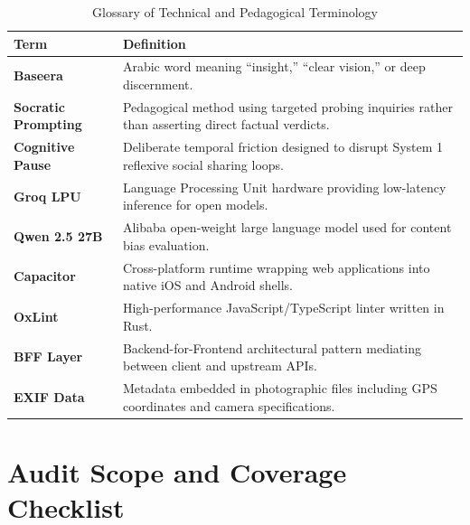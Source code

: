\documentclass[10pt,a4paper]{report}
\begin{document}
\begin{table}[htbp]
\centering
\small
\caption{Glossary of Technical and Pedagogical Terminology}
\begin{tabularx}{\textwidth}{l X}
\toprule
\textbf{Term} & \textbf{Definition} \\
\midrule
\textbf{Baseera} & Arabic word meaning ``insight,'' ``clear vision,'' or deep discernment. \\
\textbf{Socratic Prompting} & Pedagogical method using targeted probing inquiries rather than asserting direct factual verdicts. \\
\textbf{Cognitive Pause} & Deliberate temporal friction designed to disrupt System 1 reflexive social sharing loops. \\
\textbf{Groq LPU} & Language Processing Unit hardware providing low-latency inference for open models. \\
\textbf{Qwen 2.5 27B} & Alibaba open-weight large language model used for content bias evaluation. \\
\textbf{Capacitor} & Cross-platform runtime wrapping web applications into native iOS and Android shells. \\
\textbf{OxLint} & High-performance JavaScript/TypeScript linter written in Rust. \\
\textbf{BFF Layer} & Backend-for-Frontend architectural pattern mediating between client and upstream APIs. \\
\textbf{EXIF Data} & Metadata embedded in photographic files including GPS coordinates and camera specifications. \\
\bottomrule
\end{tabularx}
\end{table}

\chapter{Audit Scope and Coverage Checklist}
\end{document}
